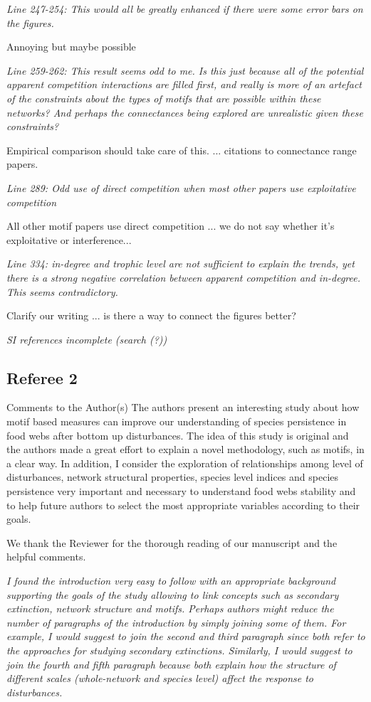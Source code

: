 \documentclass[12pt]{article}
\newcommand{\us}{\rm \setlength{\leftskip}{0.3cm} \setlength{\rightskip}{0.3cm}}
\newcommand{\them}{\it \setlength{\leftskip}{0cm} \setlength{\rightskip}{0cm}}
\begin{document}
\them
Line 247-254: This would all be greatly enhanced if there were some error bars on the figures.

\us Annoying but maybe possible

\them
Line 259-262: This result seems odd to me. Is this just because all of the potential apparent competition interactions are filled first, and really is more of an artefact of the constraints about the types of motifs that are possible within these networks? And perhaps the connectances being explored are unrealistic given these constraints?

\us Empirical comparison should take care of this. ... citations to connectance range papers.

\them
Line 289: Odd use of direct competition when most other papers use exploitative competition

\us All other motif papers use direct competition ... we do not say whether it's exploitative or interference...

\them
Line 334: in-degree and trophic level are not sufficient to explain the trends, yet there is a strong negative correlation between apparent competition and in-degree. This seems contradictory.

\us Clarify our writing ... is there a way to connect the figures better?

\them
SI references incomplete (search (?))

\us


\subsection*{Referee 2}


Comments to the Author(s)
The authors present an interesting study about how motif based measures can improve our understanding of species persistence in food webs after bottom up disturbances. The idea of this study is original and the authors made a great effort to explain a novel methodology, such as motifs, in a clear way. In addition, I consider the exploration of relationships among level of disturbances, network structural properties, species level indices and species persistence very important and necessary to understand food webs stability and to help future authors to select the most appropriate variables according to their goals.

\us
We thank the Reviewer for the thorough reading of our manuscript and the helpful comments. 

\them
I found the introduction very easy to follow with an appropriate background supporting the goals of the study allowing to link concepts such as secondary extinction, network structure and motifs. Perhaps authors might reduce the number of paragraphs of the introduction by simply joining some of them. For example, I would suggest to join the second and third paragraph since both refer to the approaches for studying secondary extinctions. Similarly, I would suggest to join the fourth and fifth paragraph because both explain how the structure of different scales (whole-network and species level) affect the response to disturbances.
\end{document}
